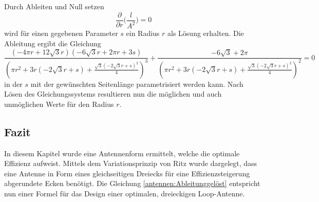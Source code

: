 Durch Ableiten und Null setzen
\begin{equation}
	\frac{\partial}{\partial{r}} \bigg(\frac{l}{A^2}\bigg)=0
	\label{antennen:Ableitung}
\end{equation}
wird für einen gegebenen Parameter $s$ ein Radius $r$ als Lösung erhalten. 
Die Ableitung ergibt die Gleichung 
\begin{equation}
	\frac{\left(- 4 \pi r + 12 \sqrt{3} r\right) \left(- 6 \sqrt{3} r + 2 \pi r + 3 s\right)}{\left(\pi r^{2} + 3 r \left(- 2 \sqrt{3} r + s\right) + \frac{\sqrt{3} \left(- 2 \sqrt{3} r + s\right)^{2}}{4}\right)^{3}} + \frac{- 6 \sqrt{3} + 2 \pi}{\left(\pi r^{2} + 3 r \left(- 2 \sqrt{3} r + s\right) + \frac{\sqrt{3} \left(- 2 \sqrt{3} r + s\right)^{2}}{4}\right)^{2}}=0
	\label{antennen:Ableitunggelöst}
\end{equation}
in der $s$ mit der gewünschten Seitenlänge parametrisiert werden kann. Nach Lösen des Gleichungssystems resultieren nun die möglichen und auch unmöglichen Werte für den Radius $r$.
\subsection{Fazit\label{antennen:fazit}}
In diesem Kapitel wurde eine Antennenform ermittelt, welche die optimale Effizienz aufweist. Mittels dem Variationsprinzip von Ritz wurde dargelegt, dass eine Antenne in Form eines gleichseitigen Dreiecks für eine Effizienzsteigerung abgerundete Ecken benötigt. Die Gleichung \eqref{antennen:Ableitunggelöst} entspricht nun einer Formel für das Design einer optimalen, dreieckigen Loop-Antenne. 
